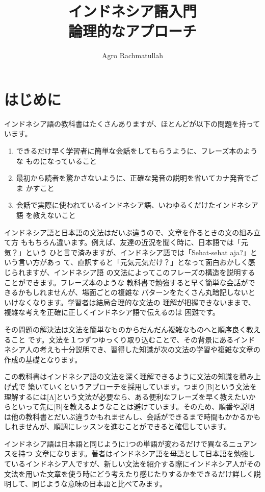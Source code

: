 \documentclass[uplatex]{jsarticle}
\title{%
  インドネシア語入門 \\ \large 論理的なアプローチ}
\author{Agro Rachmatullah}
\date{}
\theoremstyle{definition}
\begin{document}
\maketitle

\tableofcontents

\section{はじめに}

インドネシア語の教科書はたくさんありますが、ほとんどが以下の問題を持っています。

\begin{enumerate}
  \item できるだけ早く学習者に簡単な会話をしてもらうように、フレーズ本のような
    ものになっていること
  \item 最初から読者を驚かさないように、正確な発音の説明を省いてカナ発音でごま
    かすこと
  \item 会話で実際に使われているインドネシア語、いわゆるくだけたインドネシア語
    を教えないこと
\end{enumerate}

インドネシア語と日本語の文法はだいぶ違うので、文章を作るときの文の組み立て方
ももちろん違います。例えば、友達の近況を聞く時に、日本語では「元気？」という
ひと言で済みますが、インドネシア語では「Sehat-sehat aja?」という言い方があっ
て、直訳すると「元気元気だけ？」となって面白おかしく感じられますが、インドネシア語
の文法によってこのフレーズの構造を説明することができます。フレーズ本のような
教科書で勉強すると早く簡単な会話ができるかもしれませんが、場面ごとの複雑な
パターンをたくさん丸暗記しないといけなくなります。学習者は結局合理的な文法の
理解が把握できないままで、複雑な考えを正確に正しくインドネシア語で伝えるのは
困難です。

その問題の解決法は文法を簡単なものからだんだん複雑なものへと順序良く教えること
です。文法を１つずつゆっくり取り込むことで、その背景にあるインドネシア人の考えも十分説明でき、習得した知識が次の文法の学習や複雑な文章の作成の基礎となります。

この教科書はインドネシア語の文法を深く理解できるように文法の知識を積み上げ式で
築いていくというアプローチを採用しています。つまり[B]という文法を理解するには[A]という文法が必要なら、ある便利なフレーズを早く教えたいからといって先に[B]を教えるようなことは避けています。そのため、順番や説明は他の教科書とだいぶ違うかもれませんし、会話ができるまで時間もかかるかもしれませんが、順調にレッスンを進むことができると確信しています。

インドネシア語は日本語と同じように1つの単語が変わるだけで異なるニュアンスを持つ
文章になります。著者はインドネシア語を母語として日本語を勉強しているインドネシア人ですが、新しい文法を紹介する際にインドネシア人がその文法を用いた文章を使う時にどう考えたり感じたりするかをできるだけ詳しく説明して、同じような意味の日本語と比べてみます。
\end{document}
